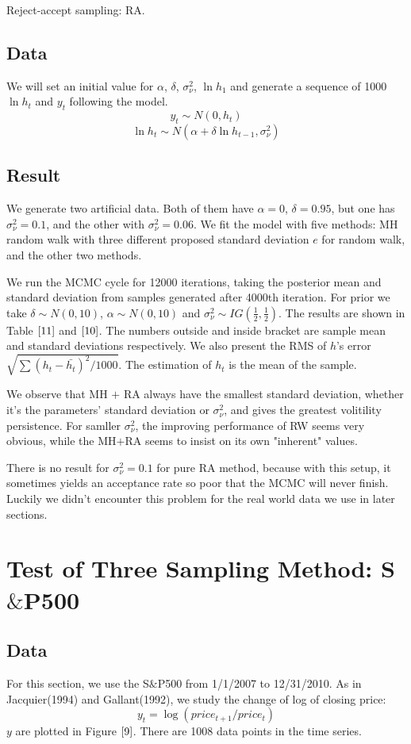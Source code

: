 \documentclass{article}
\begin{document}
Reject-accept sampling: RA.
\subsection{Data}
We will set an initial value for $\alpha$, $\delta$, $\sigma_\nu^2$, $\ln h_1$ and generate a sequence of 1000 $\ln h_t$ and $y_t$ following the model.
\[
y_t\sim N(0,h_t)
\]
\[
\ln h_t\sim N(\alpha+\delta\ln h_{t-1},\sigma_\nu^2)
\]
\subsection{Result}
We generate two artificial data. Both of them have $\alpha=0$, $\delta=0.95$, but one has $\sigma_\nu^2=0.1$, and the other with $\sigma_\nu^2=0.06$. We fit the model with five methods: MH random walk with three different proposed standard deviation $e$ for random walk, and the other two methods.

We run the MCMC cycle for 12000 iterations, taking the posterior mean and standard deviation from samples generated after 4000th iteration.  For prior we take $\delta\sim N(0,10)$, $\alpha\sim N(0,10)$ and $\sigma_\nu^2\sim IG(\frac{1}{2},\frac{1}{2})$. The results are shown in Table $\ref{11}$ and $\ref{10}$. The numbers outside and inside bracket are sample mean and standard deviations respectively. We also present the RMS of $h$'s error $\sqrt{\sum(h_t-\bar{h_t})^2/1000}$. The estimation of $h_t$ is the mean of the sample.

We observe that MH $+$ RA always have the smallest standard deviation, whether it's the parameters' standard deviation or $\sigma_\nu^2$, and gives the greatest volitility persistence. For samller $\sigma_\nu^2$, the improving performance of RW seems very obvious, while the MH$+$RA seems to insist on its own "inherent" values.

There is no result for $\sigma_\nu^2=0.1$ for pure RA method, because with this setup, it sometimes yields an acceptance rate so poor that the MCMC will never finish. Luckily we didn't encounter this problem for the real world data we use in later sections.

\section{Test of Three Sampling Method: S$\&$P500}
\subsection{Data}
For this section, we use the S$\&$P500 from 1/1/2007 to 12/31/2010. As in Jacquier(1994) and Gallant(1992), we study the change of log of closing price:
\[
y_t=\log(price_{t+1}/price_t)
\]
$y$ are plotted in Figure $\ref{9}$. There are 1008 data points in the time series.
\end{document}
